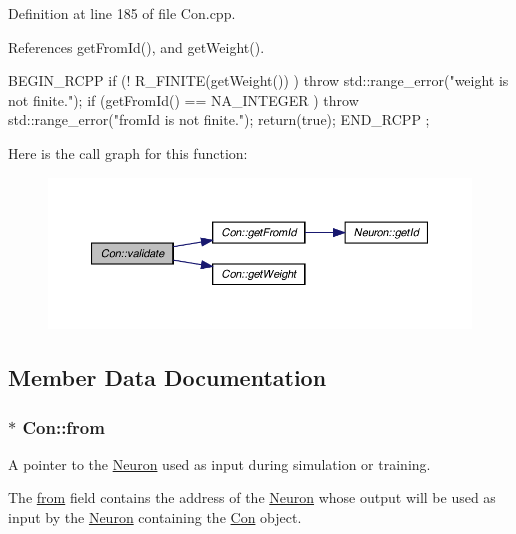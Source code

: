 Definition at line 185 of file Con.cpp.



References getFromId(), and getWeight().


\begin{DoxyCode}
                    {
        BEGIN_RCPP
        if (! R_FINITE(getWeight()) )           throw std::range_error("weight is
       not finite.");
        if (getFromId() == NA_INTEGER )         throw std::range_error("fromId is
       not finite.");
        return(true);
        END_RCPP
};
\end{DoxyCode}


Here is the call graph for this function:\nopagebreak
\begin{figure}[H]
\begin{center}
\leavevmode
\includegraphics[width=386pt]{class_con_af5f836a7b0988b3d9113589b2959d5e6_cgraph}
\end{center}
\end{figure}




\subsection{Member Data Documentation}
\hypertarget{class_con_a40215fdb25f3b2ed66e965df558e86e2}{
\subsubsection[{from}]{$\ast$ {\bf Con::from}}}
\label{class_con_a40215fdb25f3b2ed66e965df558e86e2}


A pointer to the \hyperlink{class_neuron}{Neuron} used as input during simulation or training. 

The \hyperlink{class_con_a40215fdb25f3b2ed66e965df558e86e2}{from} field contains the address of the \hyperlink{class_neuron}{Neuron} whose output will be used as input by the \hyperlink{class_neuron}{Neuron} containing the \hyperlink{class_con}{Con} object. 

